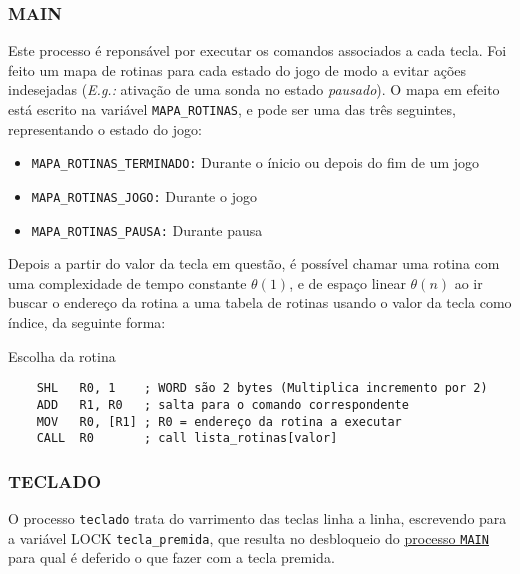 \documentclass{article}
\begin{document}
\bigbreak

\subsubsection{MAIN}
\label{sec:MAIN}

Este processo é reponsável por executar os comandos associados a cada tecla. Foi feito um mapa de rotinas para cada estado do jogo de modo a evitar ações indesejadas (\emph{E.g.:} ativação de uma sonda no estado \emph{pausado}). O mapa em efeito está escrito na variável \texttt{MAPA\_ROTINAS}, e pode ser uma das três seguintes, representando o estado do jogo:

\bigbreak

\begin{itemize}
    \item \texttt{MAPA\_ROTINAS\_TERMINADO:} Durante o ínicio ou depois do fim de um jogo
    \item \texttt{MAPA\_ROTINAS\_JOGO:} Durante o jogo
    \item \texttt{MAPA\_ROTINAS\_PAUSA:} Durante pausa
\end{itemize}


\bigbreak

Depois a partir do valor da tecla em questão, é possível chamar uma rotina com uma complexidade de tempo constante $\theta(1)$, e de espaço linear $\theta(n)$ ao ir buscar o endereço da rotina a uma tabela de rotinas usando o valor da tecla como índice, da seguinte forma:

\bigbreak

\begin{code}{Escolha da rotina}{}
    \begin{verbatim}
    SHL   R0, 1    ; WORD são 2 bytes (Multiplica incremento por 2)
    ADD   R1, R0   ; salta para o comando correspondente
    MOV   R0, [R1] ; R0 = endereço da rotina a executar
    CALL  R0       ; call lista_rotinas[valor]
    \end{verbatim}
\end{code}

\newpage

\subsubsection{TECLADO}
O processo \texttt{teclado} trata do varrimento das teclas linha a linha, escrevendo para a variável LOCK \texttt{tecla\_premida}, que resulta no desbloqueio do \hyperref[sec:MAIN]{\underline{processo \texttt{MAIN}}} para qual é deferido o que fazer com a tecla premida.
\end{document}
